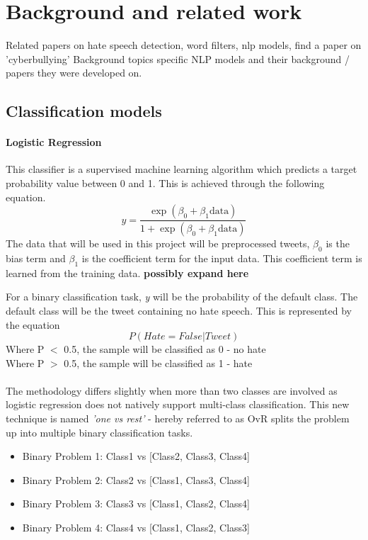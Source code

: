 \documentclass[conference]{IEEEtran}
\begin{document}
\section{Background and related work}
Related papers on hate speech detection, word filters, nlp models, find a paper on 'cyberbullying'
Background topics
specific NLP models and their background / papers they were developed on.

\subsection{Classification models}
\paragraph{\textbf{Logistic Regression}} This classifier is a supervised machine learning algorithm which predicts a target probability value between 0 and 1. This is achieved through the following equation.
\[y = \frac{\exp(\beta_{0} + \beta_{1} \text{data})}{1 + \exp(\beta_{0} + \beta_{1} \text{data})}\]
The data that will be used in this project will be preprocessed tweets, $\beta_{0}$ is the bias term and $\beta_{1}$ is the coefficient term for the input data. This coefficient term is learned from the training data. \textbf{possibly expand here}

For a binary classification task, \textit{y} will be the probability of the default class. The default class will be the tweet containing no hate speech. This is represented by the equation \[ P(Hate=False | Tweet) \]
\noindent
Where P $<$ 0.5, the sample will be classified as 0 - no hate\\
Where P $>$ 0.5, the sample will be classified as 1 - hate\\
\noindent
\\The methodology differs slightly when more than two classes are involved as logistic regression does not natively support multi-class classification. This new technique is named \textit{'one vs rest'} - hereby referred to as OvR splits the problem up into multiple binary classification tasks.\\
\begin{itemize}
  \item Binary Problem 1: Class1 vs [Class2, Class3, Class4]
  \item Binary Problem 2: Class2 vs [Class1, Class3, Class4]
  \item Binary Problem 3: Class3 vs [Class1, Class2, Class4]
  \item Binary Problem 4: Class4 vs [Class1, Class2, Class3]\\
\end{itemize}
\end{document}
